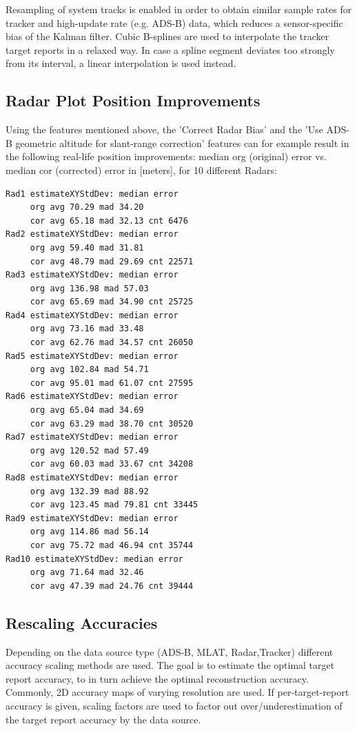 \begin{itemize}
Resampling of system tracks is enabled in order to obtain similar sample rates for tracker and high-update rate (e.g. ADS-B) data, which reduces a sensor-specific bias of the Kalman filter. 
Cubic B-splines are used to interpolate the tracker target reports in a relaxed way. In case a spline segment deviates too strongly from its interval, a linear interpolation is used instead. \\

\subsection{Radar Plot Position Improvements}

Using the features mentioned above, the 'Correct Radar Bias' and the 'Use ADS-B geometric altitude for slant-range correction' features can for example result in the following real-life position improvements: 
median org (original) error vs. median cor (corrected) error in [meters], for 10 different Radars:

\begin{lstlisting}
Rad1 estimateXYStdDev: median error
	 org avg 70.29 mad 34.20
	 cor avg 65.18 mad 32.13 cnt 6476
Rad2 estimateXYStdDev: median error
	 org avg 59.40 mad 31.81
	 cor avg 48.79 mad 29.69 cnt 22571
Rad3 estimateXYStdDev: median error
	 org avg 136.98 mad 57.03
	 cor avg 65.69 mad 34.90 cnt 25725
Rad4 estimateXYStdDev: median error
	 org avg 73.16 mad 33.48
	 cor avg 62.76 mad 34.57 cnt 26050
Rad5 estimateXYStdDev: median error
	 org avg 102.84 mad 54.71
	 cor avg 95.01 mad 61.07 cnt 27595
Rad6 estimateXYStdDev: median error
	 org avg 65.04 mad 34.69
	 cor avg 63.29 mad 38.70 cnt 30520
Rad7 estimateXYStdDev: median error
	 org avg 120.52 mad 57.49
	 cor avg 60.03 mad 33.67 cnt 34208
Rad8 estimateXYStdDev: median error
	 org avg 132.39 mad 88.92
	 cor avg 123.45 mad 79.81 cnt 33445
Rad9 estimateXYStdDev: median error
	 org avg 114.86 mad 56.14
	 cor avg 75.72 mad 46.94 cnt 35744
Rad10 estimateXYStdDev: median error
	 org avg 71.64 mad 32.46
	 cor avg 47.39 mad 24.76 cnt 39444
\end{lstlisting}

\subsection{Rescaling Accuracies}

Depending on the data source type (ADS-B, MLAT, Radar,Tracker) different accuracy scaling methods are used. The goal is to estimate the optimal target report accuracy, to in turn achieve the optimal reconstruction accuracy. 
Commonly, 2D accuracy maps of varying resolution are used. If per-target-report accuracy is given, scaling factors are used to factor out over/underestimation of the target report accuracy by the data source.


\end{itemize}
